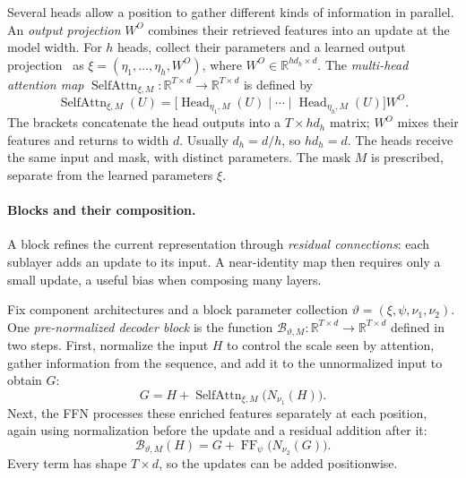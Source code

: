 \documentclass[11pt,twoside]{article}
\newcommand{\R}{\mathbb R}
\theoremstyle{plain}
\theoremstyle{definition}
\theoremstyle{remark}
\begin{document}
Several heads allow a position to gather different kinds of information in
parallel. An \emph{output projection} $W^O$ combines their retrieved features into an
update at the model width. For $h$ heads, collect their parameters and a
learned output projection~
 as
$\xi=(\eta_1,\ldots,\eta_h,W^O)$, where
$W^O\in\R^{hd_h\times d}$. The \emph{multi-head attention map}
$\operatorname{SelfAttn}_{\xi,M}:\R^{T\times d}\to\R^{T\times d}$ is defined by
\begin{equation}
\operatorname{SelfAttn}_{\xi,M}(U)
=\bigl[
\operatorname{Head}_{\eta_1,M}(U)\mid\cdots\mid
\operatorname{Head}_{\eta_h,M}(U)
\bigr]W^O.
\label{eq:self-attention-map}
\end{equation}
The brackets concatenate the head outputs into a $T\times hd_h$ matrix;
$W^O$ mixes their features and returns to width $d$. Usually $d_h=d/h$,
so $hd_h=d$. The heads receive the same input and mask, with distinct
parameters.
The mask $M$ is prescribed, separate from the learned parameters $\xi$.

\paragraph{Blocks and their composition.}
A block refines the current representation through \emph{residual
connections}: each sublayer adds an update to its input. A near-identity
map then requires only a small update, a useful bias when composing many
layers.

Fix component architectures and a block parameter collection
$\vartheta=(\xi,\psi,\nu_1,\nu_2)$. One \emph{pre-normalized decoder block}
is the function $\mathcal B_{\vartheta,M}:\R^{T\times d}\to\R^{T\times d}$
defined in two steps. First, normalize the input $H$ to control the scale seen
by attention, gather information from the sequence, and add it to the
unnormalized input to obtain $G$:
\begin{equation}
G=H+\operatorname{SelfAttn}_{\xi,M}\bigl(N_{\nu_1}(H)\bigr).
\label{eq:attention-block-diagram}
\end{equation}
Next, the FFN processes these enriched features separately at each position,
again using normalization before the update and a residual addition after it:
\begin{equation}
\mathcal B_{\vartheta,M}(H)=G+\operatorname{FF}_\psi\bigl(N_{\nu_2}(G)\bigr).
\label{eq:mlp-block-diagram}
\end{equation}
Every term has shape $T\times d$, so the updates can be added positionwise.
\end{document}
